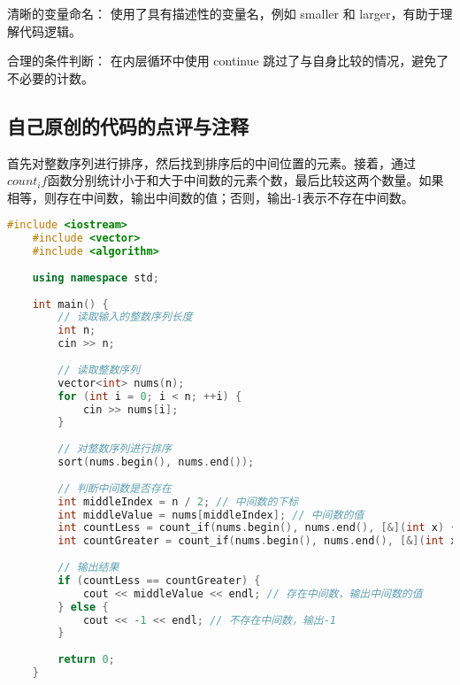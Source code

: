 清晰的变量命名： 使用了具有描述性的变量名，例如 smaller 和 larger，有助于理解代码逻辑。

合理的条件判断： 在内层循环中使用 continue 跳过了与自身比较的情况，避免了不必要的计数。

\subsection{自己原创的代码的点评与注释}

首先对整数序列进行排序，然后找到排序后的中间位置的元素。接着，通过$count_if$函数分别统计小于和大于中间数的元素个数，最后比较这两个数量。如果相等，则存在中间数，输出中间数的值；否则，输出-1表示不存在中间数。

\begin{lstlisting}[language=C++]
    #include <iostream>
    #include <vector>
    #include <algorithm>
    
    using namespace std;
    
    int main() {
        // 读取输入的整数序列长度
        int n;
        cin >> n;
    
        // 读取整数序列
        vector<int> nums(n);
        for (int i = 0; i < n; ++i) {
            cin >> nums[i];
        }
    
        // 对整数序列进行排序
        sort(nums.begin(), nums.end());
    
        // 判断中间数是否存在
        int middleIndex = n / 2; // 中间数的下标
        int middleValue = nums[middleIndex]; // 中间数的值
        int countLess = count_if(nums.begin(), nums.end(), [&](int x) { return x < middleValue; });
        int countGreater = count_if(nums.begin(), nums.end(), [&](int x) { return x > middleValue; });
    
        // 输出结果
        if (countLess == countGreater) {
            cout << middleValue << endl; // 存在中间数，输出中间数的值
        } else {
            cout << -1 << endl; // 不存在中间数，输出-1
        }
    
        return 0;
    }    
\end{lstlisting}